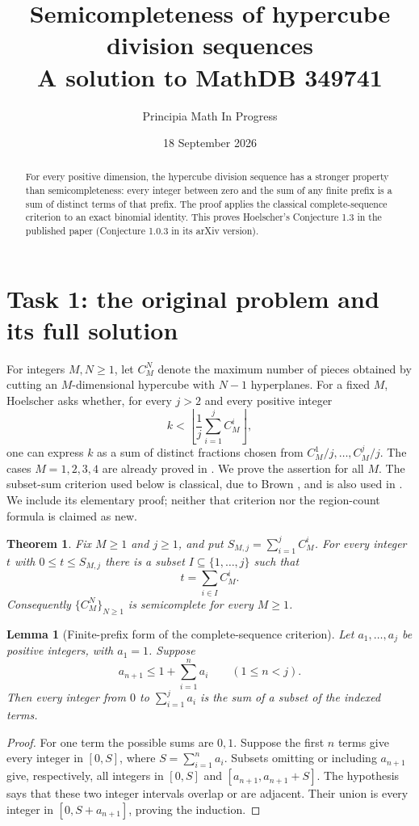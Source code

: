 \documentclass[11pt]{article}
\title{Semicompleteness of hypercube division sequences\\
\large A solution to MathDB 349741}
\author{Principia Math In Progress}
\date{18 September 2026}
\newtheorem{theorem}{Theorem}
\newtheorem{lemma}{Lemma}
\begin{document}
\maketitle
\begin{abstract}
For every positive dimension, the hypercube division sequence has a
stronger property than semicompleteness: every integer between zero and
the sum of any finite prefix is a sum of distinct terms of that prefix.
The proof applies the classical complete-sequence criterion to an exact
binomial identity. This proves Hoelscher's Conjecture 1.3 in the published
paper (Conjecture 1.0.3 in its arXiv version).
\end{abstract}

\section*{Task 1: the original problem and its full solution}
For integers $M,N\geq1$, let $C_M^N$ denote the maximum number of pieces
obtained by cutting an $M$-dimensional hypercube with $N-1$ hyperplanes.
For a fixed $M$, Hoelscher asks whether, for every $j>2$ and every positive
integer
\[
 k<\left\lfloor \frac{1}{j}\sum_{i=1}^j C_M^i\right\rfloor,
\]
one can express $k$ as a sum of distinct fractions chosen from
$C_M^1/j,\ldots,C_M^j/j$. The cases $M=1,2,3,4$ are already proved in
\cite[Theorem 1.2 and Section 3]{H}. We prove the assertion for all $M$.
The subset-sum criterion used below is classical, due to Brown
\cite{B}, and is also used in \cite[Section 3]{H}. We include its elementary
proof; neither that criterion nor the region-count formula is claimed
as new.

\begin{theorem}\label{thm:main}
Fix $M\geq1$ and $j\geq1$, and put $S_{M,j}=\sum_{i=1}^j C_M^i$.
For every integer $t$ with $0\leq t\leq S_{M,j}$ there is a subset
$I\subseteq\{1,\ldots,j\}$ such that
\[
 t=\sum_{i\in I}C_M^i.
\]
Consequently $\{C_M^N\}_{N\geq1}$ is semicomplete for every $M\geq1$.
\end{theorem}

\begin{lemma}[Finite-prefix form of the complete-sequence criterion]
Let $a_1,\ldots,a_j$ be positive integers, with $a_1=1$. Suppose
\[
 a_{n+1}\leq 1+\sum_{i=1}^n a_i\qquad(1\leq n<j).
\]
Then every integer from $0$ to $\sum_{i=1}^j a_i$ is the sum of a
subset of the indexed terms.
\end{lemma}
\begin{proof}
For one term the possible sums are $0,1$. Suppose the first $n$ terms
give every integer in $[0,S]$, where $S=\sum_{i=1}^n a_i$.
Subsets omitting or including $a_{n+1}$ give, respectively, all integers
in $[0,S]$ and $[a_{n+1},a_{n+1}+S]$. The hypothesis says that these
two integer intervals overlap or are adjacent. Their union is every
integer in $[0,S+a_{n+1}]$, proving the induction.
\end{proof}
\end{document}
